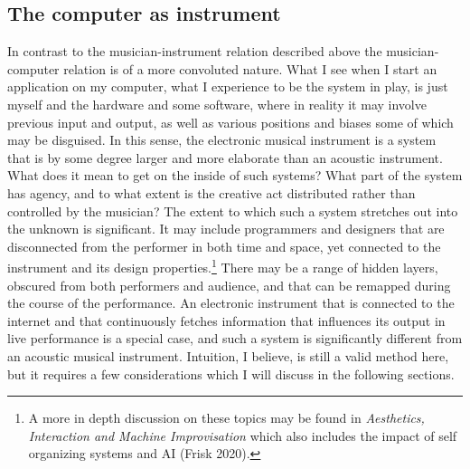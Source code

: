 \documentclass[11pt]{article}
\makeatletter
\newcommand{\cslcitation}[2]
 {\protect\hyper@linkstart{cite}{citeproc_bib_item_#1}#2\hyper@linkend}
\makeatother
\begin{document}
\subsection*{The computer as instrument}
\label{sec:org20ce392}
In contrast to the musician-instrument relation described above the musician-computer relation is of a more convoluted nature.
What I see when I start an application on my computer, what I experience to be the system in play, is just myself and the hardware and some software, where in reality it may involve previous input and output, as well as various positions and biases some of which may be disguised.
In this sense, the electronic musical instrument is a system that is by some degree larger and more elaborate than an acoustic instrument.
What does it mean to get on the inside of such systems?
What part of the system has agency, and to what extent is the creative act distributed rather than controlled by the musician?
The extent to which such a system stretches out into the unknown is significant. 
It may include programmers and designers that are disconnected from the performer in both time and space, yet connected to the instrument and its design properties.\footnote{A more in depth discussion on these topics may be found in \emph{Aesthetics, Interaction and Machine Improvisation} which also includes the impact of self organizing systems and AI (\cslcitation{15}{Frisk 2020}).}
There may be a range of hidden layers, obscured from both performers and audience, and that can be remapped during the course of the performance.
An electronic instrument that is connected to the internet and that continuously fetches information that influences its output in live performance is a special case, and such a system is significantly different from an acoustic musical instrument.
Intuition, I believe, is still a valid method here, but it requires a few considerations which I will discuss in the following sections.
\end{document}
